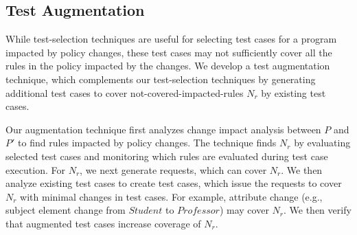 \subsection{Test Augmentation}
\label{subsec:testaugmentation}
While test-selection techniques are useful for selecting test cases for a program impacted by policy changes, these test cases may not sufficiently cover all the rules in the policy impacted by the changes.
We develop a test augmentation technique, which complements our test-selection techniques by generating additional test cases to 
cover not-covered-impacted-rules $N_r$ by existing test cases.

Our augmentation technique first analyzes change impact analysis between $P$ and $P'$ to find rules impacted by policy changes.
The technique finds $N_r$ by evaluating selected test cases and monitoring which 
rules are evaluated during test case execution.
For $N_r$, we next generate requests, which can cover $N_r$.
We then analyze existing test cases to create test cases, which issue the requests
to cover $N_r$ with minimal changes in test cases.
For example, attribute change (e.g., subject element change from $Student$ to $Professor$) may cover $N_r$. We then verify that augmented test cases increase coverage of $N_r$.









